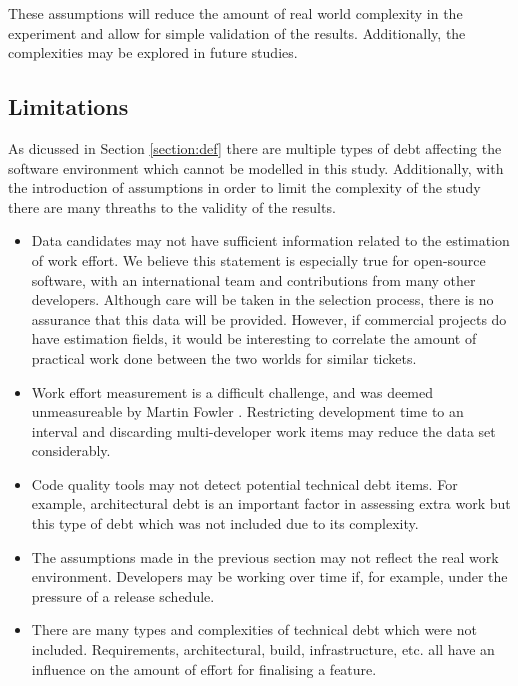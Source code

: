 \documentclass{mprop}
\begin{document}
These assumptions will reduce the amount of real world complexity in the
experiment and allow for simple validation of the results. Additionally, the
complexities may be explored in future studies.


\subsection{Limitations}

As dicussed in Section \ref{section:def} there are multiple types of debt
affecting the software environment which cannot be modelled in this study.
Additionally, with the introduction of assumptions in order to limit the
complexity of the study there are many threaths to the validity of the results.

\begin{itemize}
	\item Data candidates may not have sufficient information related to the
	      estimation of work effort. We believe this statement is especially true for
	      open-source software, with an international team and contributions from many
	      other developers. Although care will be taken in the selection process,
	      there is no assurance that this data will be provided. However, if
	      commercial projects do have estimation fields, it would be interesting to
	      correlate the amount of practical work done between the two worlds for
	      similar tickets.
	\item Work effort measurement is a difficult challenge, and was deemed
	      unmeasureable by Martin Fowler \cite{CannotMeasureProductivity}. Restricting
	      development time to an interval and discarding multi-developer work items
	      may reduce the data set considerably.
	\item Code quality tools may not detect potential technical debt items. For
	      example, architectural debt is an important factor in assessing extra work but
	      this type of debt which was not included due to its complexity.
	\item The assumptions made in the previous section may not reflect the real
	      work environment. Developers may be working over time if, for example, under
	      the pressure of a release schedule.
	\item There are many types and complexities of technical debt which were not
	      included. Requirements, architectural, build, infrastructure, etc. all have
	      an influence on the amount of effort for finalising a feature.
\end{itemize}
\end{document}
